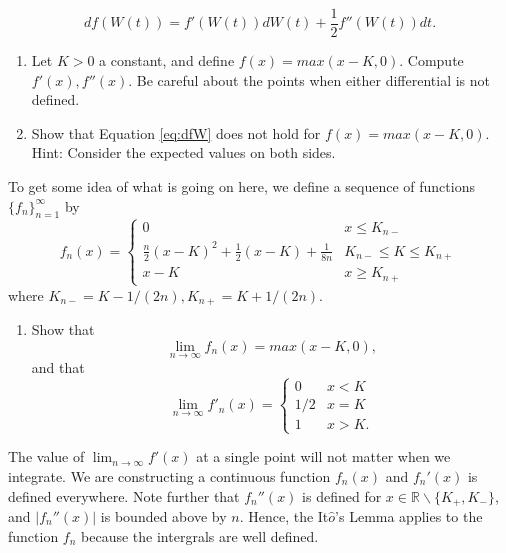 \documentclass{article}
\begin{document}
\begin{enumerate}
\begin{equation}
df(W(t)) = f'(W(t))dW(t)+\frac12f''(W(t))dt.
\label{eq:dfW}
\end{equation}
\begin{enumerate}
\item Let $K>0$ a constant, and define $f(x)=max(x-K,0)$. Compute $f'(x), f''(x)$. Be careful about the points when either differential is not defined.
\item Show that Equation \ref{eq:dfW} does not hold for $f(x)=max(x-K,0)$. Hint: Consider the expected values on both sides.
\end{enumerate}
To get some idea of what is going on here, we define a sequence of functions $\{f_n\}_{n=1}^{\infty}$ by
\[
f_n(x) = \begin{cases}
0 & x\leq K_{n-} \\
\frac n2(x-K)^2 + \frac12(x-K) +\frac1{8n} & K_{n-}\leq K\leq K_{n+}\\
x-K & x\geq K_{n+}
\end{cases}
\]
where $K_{n-}=K-1/({2n}), K_{n+}=K+1/({2n})$.
\begin{enumerate}
\addtocounter{enumii}{2}
\item Show that
\[
\lim_{n\to\infty} f_n(x) = max(x-K,0),
\]
and that 
\[
\lim_{n\to\infty} f'_n(x) = \begin{cases} 0 & x< K \\
1/2 & x=K \\
1 & x> K. \end{cases}
\]
\end{enumerate}
The value of $\lim_{n\to\infty}f'(x)$ at a single point will not matter when we integrate. We are constructing a continuous function $f_n(x)$ and $f_n'(x)$ is defined everywhere. Note further that $f_n''(x)$ is defined for $x\in\mathbb R\backslash\{K_+,K_-\}$, and $|f_n''(x)|$ is bounded above by $n$. Hence, the It$\hat o$'s Lemma applies to the function $f_n$ because the intergrals are well defined. 
\end{enumerate}
\end{document}

